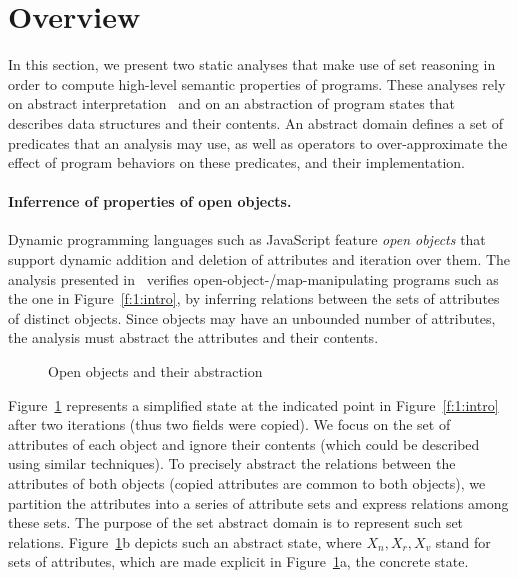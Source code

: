 \section{Overview}
\label{s:2:over}
In this section, we present two static analyses that make use of set
reasoning in order to compute high-level semantic properties of
programs.
These analyses rely on abstract interpretation~\cite{cc:popl:77} and
on an abstraction of program states that describes data structures
and their contents.
An abstract domain defines a set of predicates that an analysis may
use, as well as operators to over-approximate the effect of program
behaviors on these predicates, and their implementation.

\paragraph{Inferrence of properties of open objects.}
Dynamic programming languages such as JavaScript feature {\em open objects}
that support dynamic addition and deletion of attributes and iteration over
them.
The analysis presented in~\cite{hoo:14:sas} verifies
open-object-/map-manipulating programs such as the one
in Figure~\ref{f:1:intro}, by
inferring relations between the sets of attributes
of distinct objects.
Since objects may have an unbounded number of attributes, the analysis must 
abstract the attributes and their contents. %
\newcommand{\varsrc}{\cvar{src}}%
\newcommand{\vardst}{\cvar{dst}}%
\begin{figure}[t]
  \newcommand{\picscale}{0.82}
  \centering
    \tikzpics{\picscale}{hoo-inv}
  \caption{Open objects and their abstraction}
  \label{f:2:hoo}
\end{figure}%
Figure~\ref{f:2:hoo} represents a simplified state at the indicated
point in Figure~\ref{f:1:intro}
after two iterations (thus two fields were copied).
We focus on the set of attributes of each object and ignore their
contents (which could be described using similar techniques).
To precisely abstract the relations between the attributes of both objects
(\eg copied attributes are common to both objects), we partition the
attributes into a series of attribute sets
and express relations among these sets.
The purpose of the set abstract domain is to represent such set
relations.
Figure~\ref{f:2:hoo}b depicts such an abstract
state, where \( X_n, X_r, X_v \) stand for sets of attributes, which are
made explicit in Figure~\ref{f:2:hoo}a, the concrete state.

